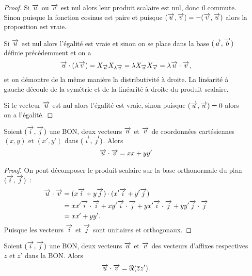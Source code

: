 \begin{proof}
  Si \(\overrightarrow{u}\) ou \(\overrightarrow{v}\) est nul alors leur produit scalaire est nul, donc il
  commute. Sinon puisque la fonction cosinus est paire et puisque \((\overrightarrow{u} , \overrightarrow{v})
  = -(\overrightarrow{v} , \overrightarrow{u})\) alors la proposition est vraie.

  Si \(\overrightarrow{u}\) est nul alors l'égalité est vraie et sinon on se place dans la base
  \((\overrightarrow{a},\overrightarrow{b})\) définie précédemment et on a \begin{equation}
    \overrightarrow{u} \cdot (\lambda \overrightarrow{v}) = X_{\overrightarrow{u}} X_{\lambda \overrightarrow{v}} = \lambda X_{\overrightarrow{u}} X_{\overrightarrow{v}}
    = \lambda \overrightarrow{u} \cdot \overrightarrow{v},
  \end{equation}
  et on démontre de la même manière la distributivité à droite. La linéarité à
  gauche découle de la symétrie et de la linéarité à droite du produit scalaire.

  Si le vecteur \(\overrightarrow{u}\) est nul alors l'égalité est vraie, sinon puisque \((\overrightarrow{u}
  , \overrightarrow{u}) = 0\) alors on a l'égalité.
\end{proof}

\begin{prop}
  Soient \((\overrightarrow{i} , \overrightarrow{j})\) une BON, deux vecteurs \(\overrightarrow{u}\) et \(\overrightarrow{v}\) de
  coordonnées cartésiennes \((x , y)\) et \((x',y')\) dans \((\overrightarrow{i} , \overrightarrow{j})\).
  Alors
  \begin{equation}
    \overrightarrow{u} \cdot \overrightarrow{v} = xx + yy'
  \end{equation}
\end{prop}

\begin{proof}
  On peut décomposer le produit scalaire sur la base orthonormale du plan \((\overrightarrow{i}
  , \overrightarrow{j})\)~:
  \begin{align}
    \overrightarrow{u} \cdot \overrightarrow{v} &= (x \overrightarrow{i} + y \overrightarrow{j}) \cdot (x' \overrightarrow{i} + y' \overrightarrow{j}) \\
                  &= x x' \overrightarrow{i} \cdot \overrightarrow{i} + xy' \overrightarrow{i} \cdot \overrightarrow{j} + yx' \overrightarrow{i} \cdot \overrightarrow{j}
                  + yy' \overrightarrow{j} \cdot \overrightarrow{j}\\
                  & = xx' +yy'.
  \end{align}
  Puisque les vecteurs \(\overrightarrow{i}\) et \(\overrightarrow{j}\) sont unitaires et orthogonaux.
\end{proof}

\begin{prop}
  Soient \((\overrightarrow{i} , \overrightarrow{j})\) une BON, deux vecteurs \(\overrightarrow{u}\) et \(\overrightarrow{v}\) des vecteurs
  d'affixes respectives \(z\) et \(z'\) dans la BON\@. Alors
  \begin{equation}
    \overrightarrow{u} \cdot \overrightarrow{v} = \Re(\overline{z} z').
  \end{equation}
\end{prop}

